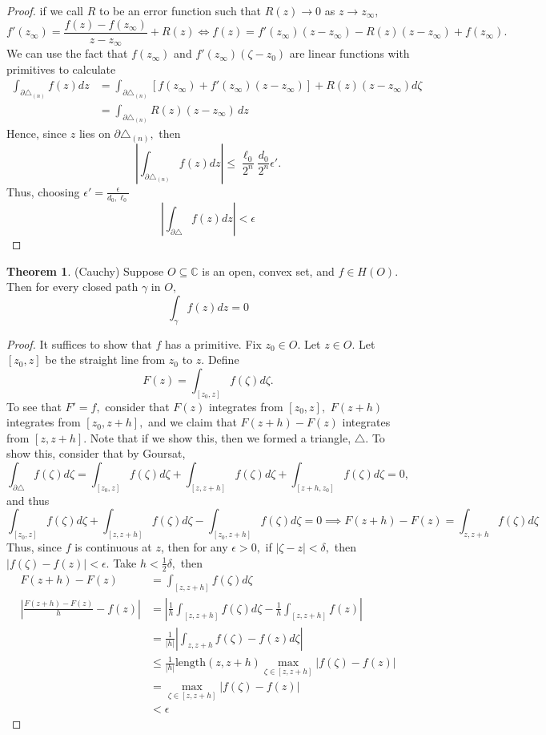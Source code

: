 \documentclass[10pt, oneside]{article}
\newcommand{\bbC}{\mathbb{C}}
\theoremstyle{definition}
\newtheorem{thm}{Theorem}
\newcommand{\bbC}{\mathbb{C}}
\begin{document}
\begin{proof}
    if we call $R$ to be an error function such that $R(z)\to 0$ as $z\to z_{\infty},$ 
    \[f'(z_\infty) = \frac{f(z) - f(z_\infty)}{z- z_\infty} + R(z) \iff f(z)= f'(z_{\infty})(z - z_{\infty}) - R(z)(z - z_{\infty}) + f(z_{\infty}).\]
    We can use the fact that $f(z_\infty)$ and  $f'(z_\infty)(\zeta - z_0)$ are linear functions with primitives to calculate
    \begin{align*}
    \int_{\partial \triangle_{(n)}}f(z)dz &= \int_{\partial \triangle_{(n)}} [f(z_\infty) + f'(z_\infty)(z - z_\infty)] + R(z)(z- z_{\infty}) d\zeta \\
    &= \int_{\partial \triangle_{(n)}}R(z)(z - z_\infty)\,dz
    \end{align*}
    Hence, since $z$ lies on $\partial \triangle_{(n)},$ then 
    \[\left|\int_{\partial \triangle_{(n)}}f(z)dz\right| \leq \frac{\ell_0   }{2^n} \frac{d_0}{2^n}\epsilon'.\] Thus, choosing $\epsilon'= \frac{\epsilon}{d_0, \ell_0}$
    \[\left|\int_{\partial \triangle}f(z)dz\right| <\epsilon\]
\end{proof}

\begin{thm}
    (Cauchy) Suppose $O\subseteq \bbC$ is an open, convex set, and $f\in H(O).$ Then for every closed path $\gamma$ in $O,$ 
    \[\int_\gamma f(z)dz = 0\]
\end{thm}

\begin{proof}
    It suffices to show that $f$ has a primitive. Fix $z_0 \in O.$ Let $z\in O.$ Let $[z_0, z]$ be the straight line from $z_0$ to $z.$ Define
    \[F(z) = \int_{[z_0, z]}f(\zeta)d\zeta.\] To see that $F' = f,$ consider that $F(z)$ integrates from $[z_0, z],$ $F(z + h)$ integrates from $[z_0, z + h],$ and we claim that $F(z + h) - F(z)$ integrates from $[z,z + h].$ Note that if we show this, then we formed a triangle, $\triangle$. To show this, 
    consider that by Goursat,
    \[\int_{\partial \triangle} f(\zeta)d\zeta = \int_{[z_0, z]} f(\zeta)d\zeta + \int_{[z, z + h]} f(\zeta)d\zeta + \int_{[z + h, z_0]} f(\zeta)d\zeta = 0,\] and thus 
    \[\int_{[z_0, z]} f(\zeta)d\zeta + \int_{[z, z + h]} f(\zeta)d\zeta - \int_{[z_0, z + h]} f(\zeta)d\zeta = 0 \implies F(z + h)- F(z)= \int_{z, z + h}f(\zeta)d\zeta\]
    Thus, since $f$ is continuous at $z$, then for any $\epsilon>0,$ if $|\zeta - z|< \delta,$ then $|f(\zeta) - f(z)|< \epsilon.$ Take $h< \frac{1}{2}\delta,$ then 
    \begin{align*}
    F(z + h) - F(z) &= \int_{[z, z + h]}f(\zeta)d\zeta\\
        \left|\frac{F(z + h) - F(z)}{h} - f(z)\right| &= \left|\frac{1}{h}\int_{[z, z + h]}f(\zeta)d\zeta - \frac{1}{h}\int_{[z,z + h]}f(z)\right|\\
        &= \frac{1}{|h|}\left|\int_{z, z + h} f(\zeta) - f(z)d\zeta\right|\\
        &\leq \frac{1}{|h|}\text{length}(z, z + h) \max_{\zeta\in [z, z + h]}|f(\zeta) - f(z)|\\
        &= \max_{\zeta \in [z, z + h]}|f(\zeta) - f(z)|\\
        &< \epsilon
    \end{align*}
\end{proof}
\end{document}
